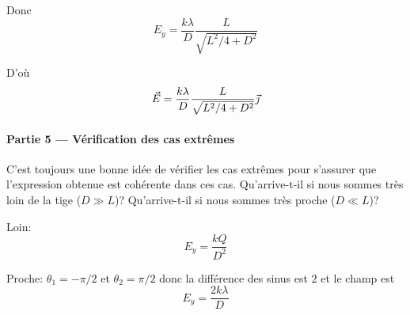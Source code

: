 Donc
\[
  E_y = \frac{k \lambda}{D}\frac{L}{\sqrt{L^2/4 + D^2}}
\]

D'où
$$\vec{E} = \frac{k \lambda}{D}\frac{L}{\sqrt{L^2/4 + D^2}}\vec{\jmath}$$


\paragraph{Partie 5 --- Vérification des cas extrêmes}

C'est toujours une bonne idée de vérifier les cas extrêmes pour s'assurer que
l'expression obtenue est cohérente dans ces cas. Qu'arrive-t-il si nous sommes
très loin de la tige ($D \gg L$)? Qu'arrive-t-il si nous sommes très proche
($D \ll L$)?

Loin:
\[
  E_y = \frac{k Q}{D^2}
\]

Proche: $\theta_1 = -\pi/2$ et $\theta_2 = \pi/2$ donc la différence des sinus
est $2$ et le champ est
\[
  E_y = \frac{2k\lambda}{D}
\]

